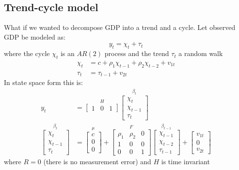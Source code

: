 \documentclass[
  letterpaper,
]{book}
\begin{document}
\hypertarget{trend-cycle-model}{%
\subsection{Trend-cycle model}\label{trend-cycle-model}}

What if we wanted to decompose GDP into a trend and a cycle. Let
observed GDP be modeled as: \[
    y_t = \chi_t + \tau_t
    \] where the cycle \(\chi_t\) is an \(AR(2)\) process and the trend
\(\tau_t\) a random walk \[
    \begin{align}
    \chi_t &= c + \rho_1 \chi_{t-1} + \rho_2 \chi_{t-2} + v_{1t} \\
    \tau_t &= \tau_{t-1} + v_{2t}
    \end{align}
\] In state space form this is: \[
    \begin{align}
    y_{t}& =\overset{H}{\left[\begin{array}{ccc} 1 & 0 & 1 \end{array} \right] }
    \overset{\beta_t} {\left[ \begin{array}{c} \chi_t \\  \chi_{t-1} \\ \tau_t  \end{array} \right] } \\
    \overset{\beta_t} {\left[\begin{array}{c} \chi_t \\  \chi_{t-1} \\ \tau_t \end{array}\right] }
    & =\overset{\mu }{\left[\begin{array}{c} c \\  0 \\  0 \end{array} \right] } + 
        \overset{F} {\left[\begin{array}{ccc} \rho_1 & \rho_2 & 0 \\ 
    1 & 0 & 0 \\ 
    0 & 0 & 1
    \end{array}
    \right] }\overset{\beta_{t-1}}{\left[ 
    \begin{array}{c}
    \chi_{t-1} \\ 
    \chi_{t-2} \\
    \tau_{t-1}  
    \end{array}
    \right] }+\left[ 
    \begin{array}{c}
    v_{1t} \\ 
    0 \\
    v_{2t} 
    \end{array}
    \right]
    \end{align}
\] where \(R=0\) (there is no measurement error) and \(H\) is time
invariant
\end{document}
